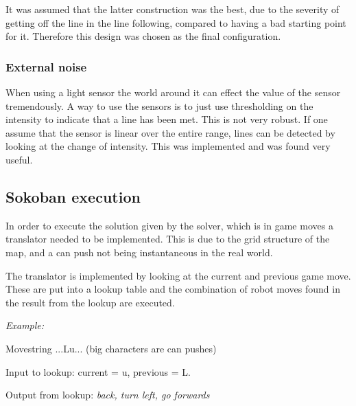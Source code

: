 It was assumed that the latter construction was the best, due to the severity of getting off the line in the line following, compared to having a bad starting point for it. Therefore this design was chosen as the final configuration.

\subsubsection{External noise}
When using a light sensor the world around it can effect the value of the sensor tremendously.
A way to use the sensors is to just use thresholding on the intensity to indicate that a line has been met.
This is not very robust.
If one assume that the sensor is linear over the entire range, lines can be detected by looking at the change of intensity.
This was implemented and was found very useful.
\subsection{Sokoban execution}

In order to execute the solution given by the solver, which is in game moves a translator needed to be implemented. This is due to the grid structure of the map, and a can push not being instantaneous in the real world.

The translator is implemented by looking at the current and previous game move. These are put into a lookup table and the combination of robot moves found in the result from the lookup are executed. 

\vspace{10pt}
{\large \textit{Example:}} 

\noindent
Movestring ...Lu... (big characters are can pushes)

\noindent
Input to lookup: current = u, previous = L.

\noindent
Output from lookup: \textit{back, turn left, go forwards}